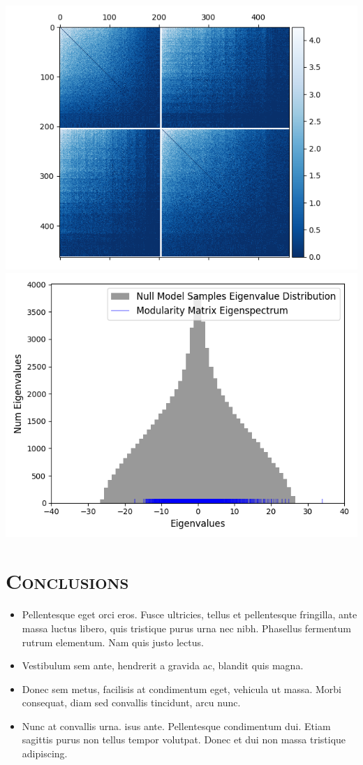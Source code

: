 \documentclass[a0,portrait]{a0poster}
\begin{document}
\begin{multicols}{2}
\begin{minipage}[b]{\linewidth}
  \includegraphics[width=0.5\linewidth]{cons_cluster_map_all_good_15.png}
  \includegraphics[width=0.5\linewidth]{eig_hist_all_good_15.png}
\end{minipage}




\section*{\color{NavyBlue}\textsc{Conclusions}\color{Black}}

\begin{itemize}
\item Pellentesque eget orci eros. Fusce ultricies, tellus et pellentesque fringilla, ante massa luctus libero, quis tristique purus urna nec nibh. Phasellus fermentum rutrum elementum. Nam quis justo lectus.
\item Vestibulum sem ante, hendrerit a gravida ac, blandit quis magna.
\item Donec sem metus, facilisis at condimentum eget, vehicula ut massa. Morbi consequat, diam sed convallis tincidunt, arcu nunc.
\item Nunc at convallis urna. isus ante. Pellentesque condimentum dui. Etiam sagittis purus non tellus tempor volutpat. Donec et dui non massa tristique adipiscing.
\end{itemize}


\end{multicols}
\end{document}
